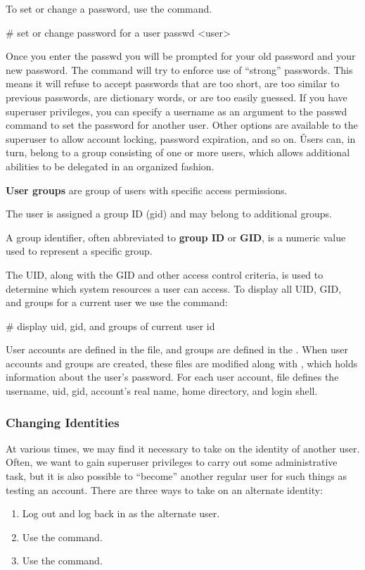 To set or change a password, use the  command.
\begin{bash}
# set or change password for a user
passwd <user>
\end{bash}

Once you enter the passwd you will be prompted for your old password and your new password. The  command
will try to enforce use of ``strong'' passwords. This means it will refuse to accept passwords that are too short,
are too similar to previous passwords, are dictionary words, or are too easily guessed. If you have superuser
privileges, you can specify a username as an argument to the passwd command to set the password for another user.
Other options are available to the superuser to allow account locking, password expiration, and so on. \v

Users can, in turn, belong to a group consisting of one or more users, which allows additional abilities to be delegated
in an organized fashion.

\textbf{User groups} are group of users with specific access permissions.
\ed

The user is assigned a group ID (gid) and may belong to additional groups.

A group identifier, often abbreviated to \textbf{group ID} or \textbf{GID}, is a numeric value used to represent a
specific group.
\ed

The UID, along with the GID and other access control criteria, is used to determine which system resources a user can
access. To display all UID, GID, and groups for a current user we use the  command:
\begin{bash}
# display uid, gid, and groups of current user
id
\end{bash}

User accounts are defined in the  file, and groups are defined in the . When
user accounts and groups are created, these files are modified along with , which holds information
about the user's password. For each user account,  file defines the username, uid, gid, account's
real name, home directory, and login shell.

\subsubsection{Changing Identities}

At various times, we may find it necessary to take on the identity of another user. Often, we want to gain superuser
privileges to carry out some administrative task, but it is also possible to ``become'' another regular user for such
things as testing an account. There are three ways to take on an alternate identity:
\begin{enumerate}
\item Log out and log back in as the alternate user.
\item Use the  command.
\item Use the  command.
\end{enumerate}


